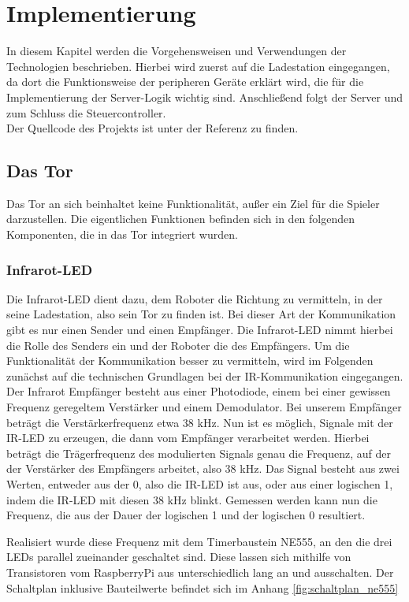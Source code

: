 \chapter{Implementierung}
\label{ch:implementierung}

In diesem Kapitel werden die Vorgehensweisen und Verwendungen der Technologien beschrieben. Hierbei wird zuerst auf die Ladestation eingegangen, da dort die Funktionsweise der peripheren Geräte erklärt wird, die für die Implementierung der Server-Logik wichtig sind. Anschließend folgt der Server und zum Schluss die Steuercontroller. \\
Der Quellcode des Projekts ist unter der Referenz \cite{PROJEKT} zu finden.


\section{Das Tor}
Das Tor an sich beinhaltet keine Funktionalität, außer ein Ziel für die Spieler darzustellen. Die eigentlichen Funktionen befinden sich in den folgenden Komponenten, die in das Tor integriert wurden.


\subsection{Infrarot-LED}
\label{sec:infrarot_led}
Die Infrarot-LED dient dazu, dem Roboter die Richtung zu vermitteln, in der seine Ladestation, also sein Tor zu finden ist. Bei dieser Art der Kommunikation gibt es nur einen Sender und einen Empfänger. Die Infrarot-LED nimmt hierbei die Rolle des Senders ein und der Roboter die des Empfängers. 
Um die Funktionalität der Kommunikation besser zu vermitteln, wird im Folgenden zunächst auf die technischen Grundlagen bei der IR-Kommunikation eingegangen.
Der Infrarot Empfänger besteht aus einer Photodiode, einem bei einer gewissen Frequenz geregeltem Verstärker und einem Demodulator. Bei unserem Empfänger beträgt die Verstärkerfrequenz etwa 38 kHz. Nun ist es möglich, Signale mit der IR-LED zu erzeugen, die dann vom Empfänger verarbeitet werden. Hierbei beträgt die Trägerfrequenz des modulierten Signals genau die Frequenz, auf der der Verstärker des Empfängers arbeitet, also 38 kHz. Das Signal besteht aus zwei Werten, entweder aus der 0, also die IR-LED ist aus, oder aus einer logischen 1, indem die IR-LED mit diesen 38 kHz blinkt. Gemessen werden kann nun die Frequenz, die aus der Dauer der logischen 1 und der logischen 0 resultiert. 

Realisiert wurde diese Frequenz mit dem Timerbaustein NE555, an den die drei LEDs parallel zueinander geschaltet sind. Diese lassen sich mithilfe von Transistoren vom RaspberryPi aus unterschiedlich lang an und ausschalten. Der Schaltplan inklusive Bauteilwerte befindet sich im Anhang \ref{fig:schaltplan_ne555}


